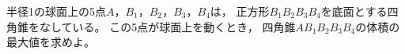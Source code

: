 \documentclass[../../main.tex]{subfiles}
\begin{document}
半径1の球面上の5点$A$，$B_1$，$B_2$，$B_3$，$B_4$は，
正方形$B_1B_2B_3B_4$を底面とする四角錐をなしている。
この5点が球面上を動くとき，
四角錐$AB_1B_2B_3B_4$の体積の最大値を求めよ。
\end{document}
